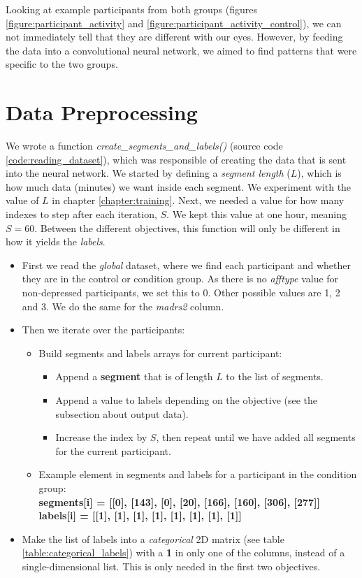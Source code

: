 Looking at example participants from both groups (figures \ref{figure:participant_activity} and \ref{figure:participant_activity_control}), we can not immediately tell that they are different with our eyes. However, by feeding the data into a convolutional neural network, we aimed to find patterns that were specific to the two groups. 

\section{Data Preprocessing}
\label{section:data_preprocessing}

We wrote a function \textit{create\_segments\_and\_labels()} (source code \ref{code:reading_dataset}), which was responsible of creating the data that is sent into the neural network. We started by defining a \textit{segment length} ($L$), which is how much data (minutes) we want inside each segment. We experiment with the value of $L$ in chapter \ref{chapter:training}. Next, we needed a value for how many indexes to step after each iteration, $S$. We kept this value at one hour, meaning $S=60$. Between the different objectives, this function will only be different in how it yields the \textit{labels}.

\begin{itemize}
  \item First we read the \textit{global} dataset, where we find each participant and whether they are in the control or condition group. As there is no \textit{afftype} value for non-depressed participants, we set this to 0. Other possible values are 1, 2 and 3. We do the same for the \textit{madrs2} column.
  \item Then we iterate over the participants:

  \begin{itemize}
    \item Build segments and labels arrays for current participant:
    \begin{itemize}
      \item Append a \textbf{segment} that is of length $L$ to the list of segments. 
      \item Append a value to labels depending on the objective (see the subsection about output data).
      \item Increase the index by $S$, then repeat until we have added all segments for the current participant.
    \end{itemize}
    \item Example element in segments and labels for a participant in the condition group: \\
    \textbf{segments[i] = [[0], [143], [0], [20], [166], [160], [306], [277]]}\\
    \textbf{labels[i] = [[1], [1], [1], [1], [1], [1], [1], [1]]}
  \end{itemize}
  
  \item Make the list of labels into a \textit{categorical} 2D matrix (see table \ref{table:categorical_labels}) with a \textbf{1} in only one of the columns, instead of a single-dimensional list. This is only needed in the first two objectives.
\end{itemize}

